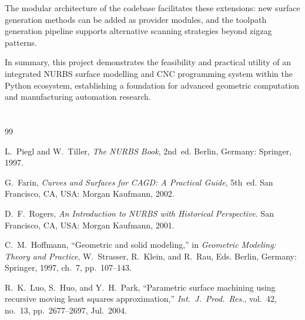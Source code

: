 \documentclass[a4paper,12pt]{article}
\begin{document}
The modular architecture of the codebase facilitates these extensions: new
surface generation methods can be added as provider modules, and the toolpath
generation pipeline supports alternative scanning strategies beyond zigzag
patterns.

In summary, this project demonstrates the feasibility and practical utility of
an integrated NURBS surface modelling and CNC programming system within the
Python ecosystem, establishing a foundation for advanced geometric computation
and manufacturing automation research.

\section*{}

\begin{thebibliography}{99}

L.~Piegl and W.~Tiller,
\emph{The NURBS Book}, 2nd~ed.
Berlin, Germany: Springer, 1997.

G.~Farin,
\emph{Curves and Surfaces for CAGD: A Practical Guide}, 5th~ed.
San Francisco, CA, USA: Morgan Kaufmann, 2002.

D.~F.~Rogers,
\emph{An Introduction to NURBS with Historical Perspective}.
San Francisco, CA, USA: Morgan Kaufmann, 2001.

C.~M.~Hoffmann,
``Geometric and solid modeling,'' in
\emph{Geometric Modeling: Theory and Practice},
W.~Strasser, R.~Klein, and R.~Rau, Eds.
Berlin, Germany: Springer, 1997, ch.~7, pp.~107--143.

R.~K.~Luo, S.~Huo, and Y.~H.~Park,
``Parametric surface machining using recursive moving least squares
approximation,''
\emph{Int.\ J.\ Prod.\ Res.}, vol.~42, no.~13, pp.~2677--2697, Jul.~2004.






\end{thebibliography}
\end{document}
